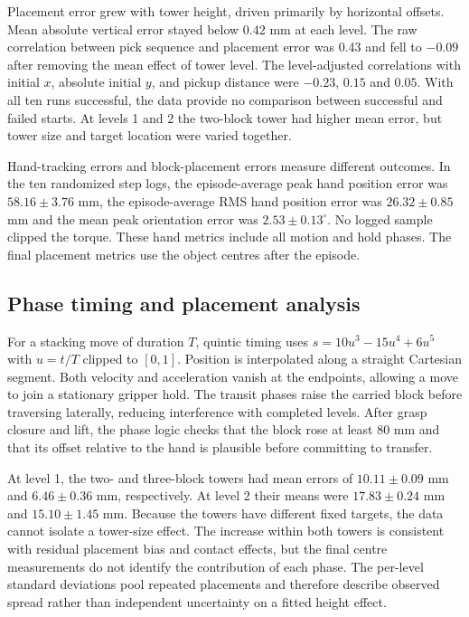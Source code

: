 \documentclass[12pt,a4paper]{article}
\begin{document}
Placement error grew with tower height, driven primarily by horizontal offsets. Mean absolute vertical error stayed below 0.42 mm at each level. The raw correlation between pick sequence and placement error was 0.43 and fell to $-0.09$ after removing the mean effect of tower level. The level-adjusted correlations with initial $x$, absolute initial $y$, and pickup distance were $-0.23$, $0.15$ and $0.05$. With all ten runs successful, the data provide no comparison between successful and failed starts. At levels 1 and 2 the two-block tower had higher mean error, but tower size and target location were varied together.

Hand-tracking errors and block-placement errors measure different outcomes. In the ten randomized step logs, the episode-average peak hand position error was $58.16\pm3.76$ mm, the episode-average RMS hand position error was $26.32\pm0.85$ mm and the mean peak orientation error was $2.53\pm0.13^\circ$. No logged sample clipped the torque. These hand metrics include all motion and hold phases. The final placement metrics use the object centres after the episode.

\subsection{Phase timing and placement analysis}
For a stacking move of duration $T$, quintic timing uses $s=10u^3-15u^4+6u^5$ with $u=t/T$ clipped to $[0,1]$. Position is interpolated along a straight Cartesian segment. Both velocity and acceleration vanish at the endpoints, allowing a move to join a stationary gripper hold. The transit phases raise the carried block before traversing laterally, reducing interference with completed levels. After grasp closure and lift, the phase logic checks that the block rose at least 80 mm and that its offset relative to the hand is plausible before committing to transfer.

At level 1, the two- and three-block towers had mean errors of $10.11\pm0.09$ mm and $6.46\pm0.36$ mm, respectively. At level 2 their means were $17.83\pm0.24$ mm and $15.10\pm1.45$ mm. Because the towers have different fixed targets, the data cannot isolate a tower-size effect. The increase within both towers is consistent with residual placement bias and contact effects, but the final centre measurements do not identify the contribution of each phase. The per-level standard deviations pool repeated placements and therefore describe observed spread rather than independent uncertainty on a fitted height effect.
\end{document}
